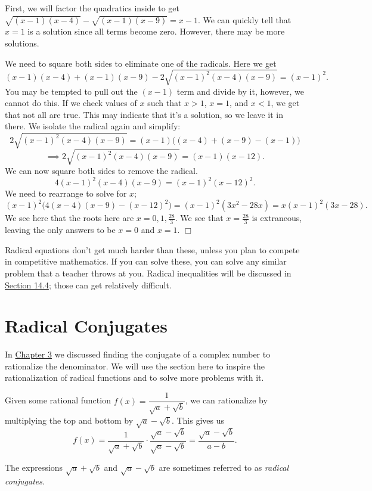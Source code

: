 \documentclass[lang=en,11pt]{elegantbook}
\begin{document}
\begin{solution}
First, we will factor the quadratics inside to get $\sqrt{(x-1)(x-4)}-\sqrt{(x-1)(x-9)}=x-1.$ We can quickly tell that $x=1$ is a solution since all terms become zero.  However, there may be more solutions.

We need to square both sides to eliminate one of the radicals.  Here we get $$(x-1)(x-4)+(x-1)(x-9)-2\sqrt{(x-1)^2(x-4)(x-9)}=(x-1)^2.$$ You may be tempted to pull out the $(x-1)$ term and divide by it, however, we cannot do this. If we check values of $x$ such that $x>1$, $x=1$, and $x<1$, we get that not all are true. This may indicate that it's a solution, so we leave it in there. We isolate the radical again and simplify: $$2\sqrt{(x-1)^2(x-4)(x-9)}=(x-1)\big((x-4)+(x-9)-(x-1)\big)$$ $$\implies 2\sqrt{(x-1)^2(x-4)(x-9)}=(x-1)(x-12).$$
We can now square both sides to remove the radical. $$4(x-1)^2(x-4)(x-9)=(x-1)^2(x-12)^2.$$ We need to rearrange to solve for $x$; $$(x-1)^2\big(4(x-4)(x-9)-(x-12)^2\big)=(x-1)^2(3x^2-28x)=x(x-1)^2(3x-28).$$
We see here that the roots here are $x=0,1,\frac{28}{3}.$ We see that $x=\frac{28}{3}$ is extraneous, leaving the only answers to be $x=0$ and $x=1$. $\Box$
\end{solution}
Radical equations don't get much harder than these, unless you plan to compete in competitive mathematics.  If you can solve these, you can solve any similar problem that a teacher throws at you.  Radical inequalities will be discussed in \hyperlink{section.14.4}{Section 14.4}; those can get relatively difficult.
\section{Radical Conjugates}
\noindent In \hyperlink{chapter.3}{Chapter 3} we discussed finding the conjugate of a complex number to rationalize the denominator.  We will use the section here to inspire the rationalization of radical functions and to solve more problems with it.

Given some rational function $f(x)=\dfrac{1}{\sqrt{a}+\sqrt{b}}$, we can rationalize by multiplying the top and bottom by $\sqrt{a}-\sqrt{b}$.  This gives us $$f(x)=\dfrac{1}{\sqrt{a}+\sqrt{b}}\cdot\dfrac{\sqrt{a}-\sqrt{b}}{\sqrt{a}-\sqrt{b}}=\dfrac{\sqrt{a}-\sqrt{b}}{a-b}.$$
\begin{remark}
The expressions $\sqrt{a}+\sqrt{b}$ and $\sqrt{a}-\sqrt{b}$ are sometimes referred to as \textit{radical conjugates}.
\end{remark}
\end{document}
